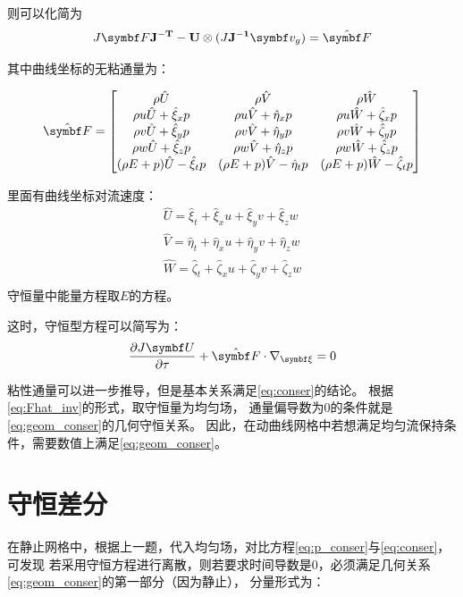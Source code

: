 \documentclass[UTF8,zihao=5]{ctexart} %
\newcommand{\bm}[1]{{\mathbf{#1}}}
\newcommand*{\pd}[2]{\frac{\partial #1}{\partial #2}}
\newcommand*{\nb}[0]{{\nabla}}
\begin{document}
则可以化简为
$$
    J\F\bm{J^{-T}} - \bm{U}\otimes(J\bm{J^{-1}}\vg) = \hat{\F}
$$

其中曲线坐标的无粘通量为：

\begin{equation}
    \hat{\F}
    =
    \begin{bmatrix}
        \rho \hat{U}                        & \rho \hat{V}                         & \rho \hat{W}                          \\
        \rho u\hat{U} + \hat{\xi}_x p       & \rho u\hat{V} + \hat{\eta}_x p       & \rho u\hat{W} + \hat{\zeta}_x p       \\
        \rho v\hat{U} + \hat{\xi}_y p       & \rho v\hat{V} + \hat{\eta}_y p       & \rho v\hat{W} + \hat{\zeta}_y p       \\
        \rho w\hat{U} + \hat{\xi}_z p       & \rho w\hat{V} + \hat{\eta}_z p       & \rho w\hat{W} + \hat{\zeta}_z p       \\
        (\rho E + p)\hat{U} - \hat{\xi}_t p & (\rho E + p)\hat{V} - \hat{\eta}_t p & (\rho E + p)\hat{W} - \hat{\zeta}_t p \\
    \end{bmatrix}
    \label{eq:Fhat_inv}
\end{equation}

里面有曲线坐标对流速度：
$$
    \begin{aligned}
        \hat{U} = \hat{\xi}_t + \hat{\xi}_x u + \hat{\xi}_y v + \hat{\xi}_z w         \\
        \hat{V} = \hat{\eta}_t + \hat{\eta}_x u + \hat{\eta}_y v + \hat{\eta}_z w     \\
        \hat{W} = \hat{\zeta}_t + \hat{\zeta}_x u + \hat{\zeta}_y v + \hat{\zeta}_z w \\
    \end{aligned}
$$
守恒量中能量方程取$E$的方程。

这时，守恒型方程可以简写为：
$$
    \pd{J\U}{\tau}+
    \hat{\F}\cdot\nb_{\xxii}=0
$$

粘性通量可以进一步推导，但是基本关系满足\eqref{eq:conser}的结论。
根据\eqref{eq:Fhat_inv}的形式，取守恒量为均匀场，
通量偏导数为0的条件就是\eqref{eq:geom_conser}的几何守恒关系。
因此，在动曲线网格中若想满足均匀流保持条件，需要数值上满足\eqref{eq:geom_conser}。

\section{守恒差分}

在静止网格中，根据上一题，代入均匀场，对比方程\eqref{eq:p_conser}与\eqref{eq:conser}，可发现
若采用守恒方程进行离散，则若要求时间导数是0，必须满足几何关系\eqref{eq:geom_conser}的第一部分（因为静止），
分量形式为：
\end{document}
